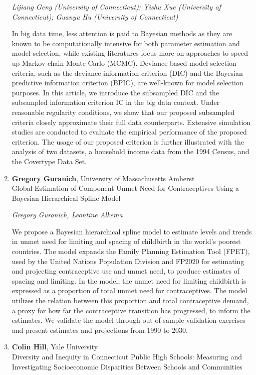\begin{enumerate}
\emph{\footnotesize Lijiang Geng (University of Connecticut); Yishu Xue (University of Connecticut); Guanyu Hu (University of Connecticut)}

In big data time, less attention is paid to Bayesian methods as they are known to be computationally intensive for both parameter estimation and model selection, while existing literatures focus more on approaches to speed up Markov chain Monte Carlo (MCMC). Deviance-based model selection criteria, such as the deviance information criterion (DIC) and the Bayesian predictive information criterion (BPIC), are well-known for model selection purposes. In this article, we introduce the subsampled DIC and the subsampled information criterion IC in the big data context. Under reasonable regularity conditions, we show that our proposed subsampled criteria closely approximate their full data counterparts. Extensive simulation studies are conducted to evaluate the empirical performance of the proposed criterion. The usage of our proposed criterion is further illustrated with the analysis of two datasets, a household income data from the 1994 Census, and the Covertype Data Set.

\item \textbf{Gregory Guranich}, University of Massachusetts Amherst \\
Global Estimation of Component Unmet Need for Contraceptives Using a Bayesian Hierarchical Spline Model

\emph{\footnotesize Gregory Guranich, Leontine Alkema}

We propose a Bayesian hierarchical spline model to estimate levels and trends in unmet need for limiting and spacing of childbirth in the world's poorest countries. The model expands the Family Planning Estimation Tool (FPET), used by the United Nations Population Division and FP2020 for estimating and projecting contraceptive use and unmet need, to produce estimates of spacing and limiting. In the model, the unmet need for limiting childbirth is expressed as a proportion of total unmet need for contraceptives. The model utilizes the relation between this proportion and total contraceptive demand, a proxy for how far the contraceptive transition has progressed, to inform the estimates. We validate the model through out-of-sample validation exercises and present estimates and projections from 1990 to 2030.

\item \textbf{Colin Hill}, Yale University \\
Diversity and Inequity in Connecticut Public High Schools: Measuring and Investigating Socioeconomic Disparities Between Schools and Communities


\end{enumerate}
